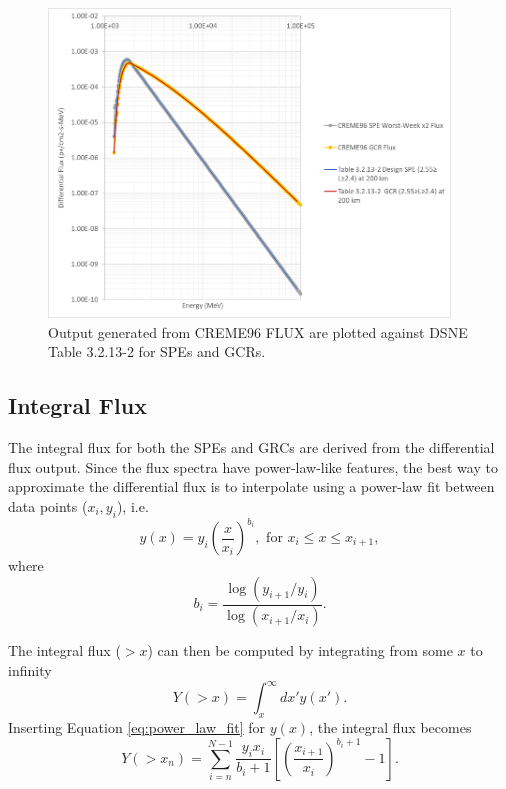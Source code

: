 \documentclass{hitec}
\begin{document}
\begin{figure}[htbp!]
	\centering
	\includegraphics[width=0.95\textwidth]{DSNE_Differential_Flux_Comparison.png}
	\caption{Output generated from CREME96 \textsf{FLUX} are plotted against DSNE Table 3.2.13-2 for SPEs and GCRs.}\label{fig:DSNE_Differential_Flux_Comparison}
\end{figure}

\clearpage %

\subsection{Integral Flux}

The integral flux for both the SPEs and GRCs are derived from the differential flux output. Since the flux spectra have power-law-like features, the best way to approximate the differential flux is to interpolate using a power-law fit between data points ($x_i, y_i$), i.e.
\begin{equation}\label{eq:power_law_fit}
	y(x) = y_i\left(\frac{x}{x_i}\right)^{b_i}, \text{ for $x_i \le x \le x_{i+1}$},
\end{equation}
where
\begin{equation}
	b_i = \frac{\log(y_{i+1}/y_i)}{\log(x_{i+1}/x_i)}.
\end{equation}

The integral flux ($>x$) can then be computed by integrating from some $x$ to infinity
\begin{equation}
	Y(>x) = \int_{x}^{\infty}dx'y(x').
\end{equation}
Inserting Equation \eqref{eq:power_law_fit} for $y(x)$, the integral flux becomes
\begin{equation}\label{eq:power-law_fitted_Integral_Flux}
	Y(>x_n) = \sum_{i=n}^{N-1} \frac{y_i x_i}{b_i + 1}\left[\left(\frac{x_{i+1}}{x_i}\right)^{b_i + 1} - 1\right].
\end{equation}
\end{document}
